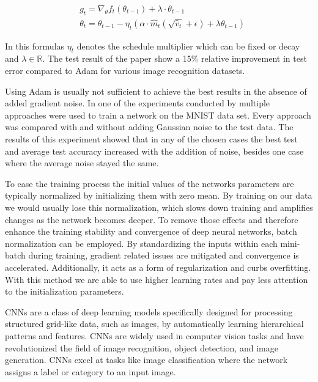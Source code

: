 \documentclass[
a4paper, 
12pt,
grayscalebody, %
abstract=on,
twoside, BCOR10mm, 12pt, DIV13,headinclude, footexclude, final, abstracton, openright
]{ibireprt}
\numberwithin{equation}{chapter}
\numberwithin{table}{chapter}
\numberwithin{figure}{chapter}
\numberwithin{algorithm}{chapter}
\numberwithin{example}{chapter}
\numberwithin{example}{chapter}
\begin{document}
\begin{align}
		&g_t  = \nabla_\theta f_t(\theta_{t-1})+\lambda\cdot\theta_{t-1}\\
		&\theta_t = \theta_{t-1}-\eta_t (\alpha\cdot\hat{m}_t(\sqrt{\hat{v}_t}+\epsilon)+\lambda\theta_{t-1})
\end{align}  

In this formulas $\eta_t$ denotes the schedule multiplier which can be fixed or decay and $\lambda \in \mathbb{R}$. The test result of the paper show a 15\% relative improvement in test error compared to Adam for various image recognition datasets.

 
Using Adam is usually not sufficient to achieve the best results in the absence of added gradient noise. In one of the experiments conducted by \cite{Neelakantan2015} multiple approaches were used to train a network on the MNIST data set. Every approach was compared with and without adding Gaussian noise to the test data. The results of this experiment showed that in any of the chosen cases the best test and average test accuracy increased with the addition of noise, besides one case where the average noise stayed the same. 



To ease the training process the initial values of the networks parameters are typically normalized by initializing them with zero mean. By training on our data we would usually lose this normalization, which slows down training and amplifies changes as the network becomes deeper. To remove those effects and therefore enhance the training stability and convergence of deep neural networks, batch normalization can be employed. \cite{Ioffe2015} By standardizing the inputs within each mini-batch during training, gradient related issues are mitigated and convergence is  accelerated. Additionally, it acts as a form of regularization and curbs overfitting. With this method we are able to use higher learning rates and pay less attention to the initialization parameters. \cite{Ruder2016} 



CNNs are a class of deep learning models specifically designed for processing structured grid-like data, such as images, by automatically learning hierarchical patterns and features. CNNs are widely used in computer vision tasks and have revolutionized the field of image recognition, object detection, and image generation. CNNs excel at tasks like image classification where the network assigns a label or category to an input image.
\end{document}
